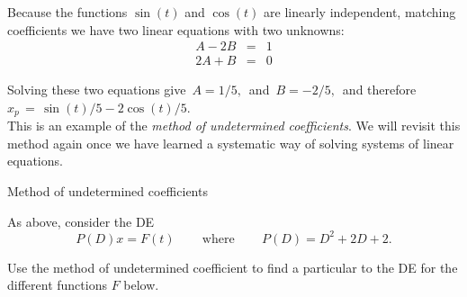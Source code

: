 Because the functions $\sin⁡ (t)$ and $\cos⁡ (t)$ are linearly independent,
matching coefficients we have two linear equations with two unknowns:
\begin{eqnarray*}
  A - 2B &=& 1 \\
  2A + B &=& 0 
\end{eqnarray*}

Solving these two equations give $\, A=1/5,\,$ and $\, B=-2/5,\,$
and therefore $x_ p\, =\,  \sin (t)/5-2\cos (t)/5$.\\

This is an example of the \emph{\color{blue}method of undetermined coefficients}.
We will revisit this method again once we have learned
a systematic way of solving systems of linear equations.

\begin{homework}
  Method of undetermined coefficients
\end{homework}

As above, consider the DE
\begin{equation*}
  P(D)x=F(t)\,  \qquad \text {where}\,  \qquad P(D)=D^2+2D+2.
\end{equation*}

Use the method of undetermined coefficient to find a particular to the DE
for the different functions $F$ below.

